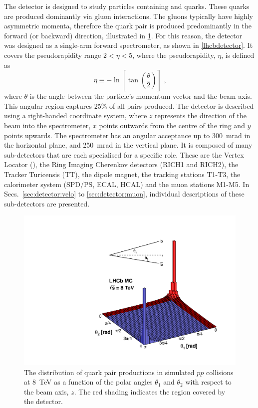 The \lhcb detector is designed to study particles containing \bquark and \cquark quarks. These quarks are produced dominantly via gluon interactions. The gluons typically have highly asymmetric momenta, therefore the \bquark\bquarkbar quark pair is produced predominantly in the forward (or backward) direction, illustrated in \fig\ref{bbar}. For this reason, the \lhcb detector~\cite{Alves:2008zz,LHCb-DP-2014-002} was designed as a single-arm forward spectrometer, as shown in \fig\ref{lhcbdetector}. It covers the \mbox{pseudorapidity} range $2<\eta <5$, where the pseudorapidity, $\eta$, is defined as
\begin{equation}
\eta \equiv -\ln \left[ \tan \left( \frac{\theta}{2} \right) \right] \text{ ,}
\end{equation}
where $\theta$ is the angle between the particle's momentum vector and the beam axis. This angular region captures 25\% of all \bquark\bquarkbar pairs produced. The detector is described using a right-handed coordinate system, where $z$ represents the direction of the beam into the spectrometer, $x$ points outwards from the centre of the ring and $y$ points upwards. The \lhcb spectrometer has an angular acceptance up to 300~mrad in the horizontal plane, and 250~mrad in the vertical plane. It is composed of many sub-detectors that are each specialised for a specific role. These are the Vertex Locator (\velo), the Ring Imaging Cherenkov detectors (RICH1 and RICH2), the Tracker Turicensis (TT), the dipole magnet, the tracking stations T1-T3, the calorimeter system (SPD/PS, ECAL, HCAL) and the muon stations M1-M5. In Secs.~\ref{sec:detector:velo} to \ref{sec:detector:muon}, individual descriptions of these sub-detectors are presented.

\begin{figure}
\centering
\includegraphics[width=0.5\linewidth]{figures/detector/08_rad_acc_scheme_right.pdf}
\caption{The distribution of \bquark\bquarkbar quark pair productions in simulated $pp$ collisions at 8~TeV as a function of the polar angles $\theta_1$ and $\theta_2$ with respect to the beam axis, $z$. The red shading indicates the region covered by the \lhcb detector.}
\label{bbar}
\end{figure}

